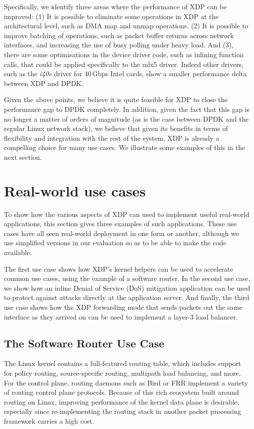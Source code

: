 \documentclass[10pt,sigconf]{acmart}
\begin{document}
Specifically, we identify three areas where the performance of XDP can be
improved: (1) It is possible to eliminate some operations in XDP at the
architectural level, such as DMA map and unmap operations. (2) It is possible to
improve batching of operations, such as packet buffer returns across network
interfaces, and increasing the use of busy polling under heavy load. And (3),
there are some optimisations in the device driver code, such as inlining
function calls, that could be applied specifically to the mlx5 driver. Indeed
other drivers, such as the \emph{i40e} driver for 40\,Gbps Intel cards, show a
smaller performance delta between XDP and DPDK.

Given the above points, we believe it is quite feasible for XDP to close the
performance gap to DPDK completely. In addition, given the fact that this gap is
no longer a matter of orders of magnitude (as is the case between DPDK and the
regular Linux network stack), we believe that given its benefits in terms of
flexibility and integration with the rest of the system, XDP is already a
compelling choice for many use cases. We illustrate some examples of this in the
next section.

\section{Real-world use cases}
\label{sec:usecases}
To show how the various aspects of XDP can used to implement useful real-world
applications, this section gives three examples of such applications. These use
cases have all seen real-world deployment in one form or another, although we
use simplified versions in our evaluation so as to be able to make the code
available.

The first use case shows how XDP's kernel helpers can be used to accelerate
common use cases, using the example of a software router. In the second use
case, we show how an inline Denial of Service (DoS) mitigation application can
be used to protect against attacks directly at the application server. And
finally, the third use case shows how the XDP forwarding mode that sends packets
out the same interface as they arrived on can be used to implement a layer-3
load balancer.

\subsection{The Software Router Use Case}
\label{sec:fwd-usecase}
The Linux kernel contains a full-featured routing table, which includes support
for policy routing, source-specific routing, multipath load balancing, and more.
For the control plane, routing daemons such as Bird or FRR implement a variety
of routing control plane protocols. Because of this rich ecosystem built around
routing on Linux, improving performance of the kernel data plane is desirable;
especially since re-implementing the routing stack in another packet processing
framework carries a high cost.
\end{document}
